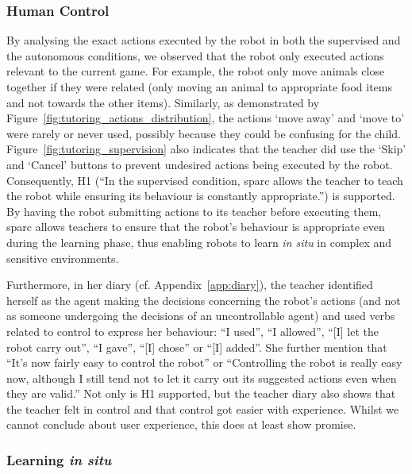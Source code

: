 \subsubsection{Human Control} \label{sec:tuto_control}
By analysing the exact actions executed by the robot in both the supervised and the autonomous conditions, we observed that the robot only executed actions relevant to the current game. For example, the robot only move animals close together if they were related (only moving an animal to appropriate food items and not towards the other items). Similarly, as demonstrated by Figure~\ref{fig:tutoring_actions_distribution}, the actions `move away' and `move to' were rarely or never used, possibly because they could be confusing for the child. Figure~\ref{fig:tutoring_supervision} also indicates that the teacher did use the `Skip' and `Cancel' buttons to prevent undesired actions being executed by the robot. Consequently, H1 (``In the supervised condition, \gls{sparc} allows the teacher to teach the robot while ensuring its behaviour is constantly appropriate.'') is supported. By having the robot submitting actions to its teacher before executing them, \gls{sparc} allows teachers to ensure that the robot's behaviour is appropriate even during the learning phase, thus enabling robots to learn \emph{in situ} in complex and sensitive environments.

Furthermore, in her diary (cf. Appendix~\ref{app:diary}), the teacher identified herself as the agent making the decisions concerning the robot's actions (and not as someone undergoing the decisions of an uncontrollable agent) and used verbs related to control to express her behaviour: ``I used'', ``I allowed'', ``[I] let the robot carry out'', ``I gave'', ``[I] chose'' or ``[I] added''. She further mention that ``It’s now fairly easy to control the robot'' or ``Controlling the robot is really easy now, although I still tend not to let it carry out its suggested actions even when they are valid.'' 
Not only is H1 supported, but the teacher diary also shows that the teacher felt in control and that control got easier with experience. Whilst we cannot conclude about user experience, this does at least show promise.



\subsubsection{Learning \emph{in situ}}

